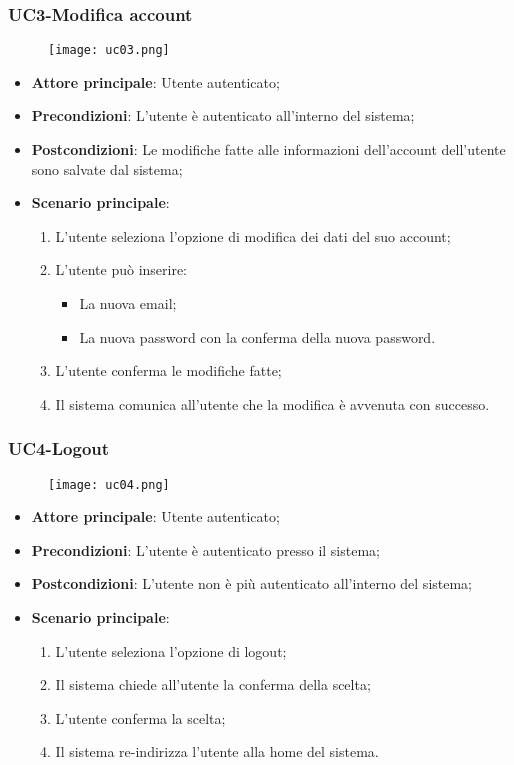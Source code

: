 \nonstopmode
\pagebreak
\subsubsection{UC3-Modifica account}
\begin{figure}[h] \texttt{[image: uc03.png]} \end{figure}

\begin{itemize}
\item \textbf{Attore principale}: Utente autenticato;
\item \textbf{Precondizioni}: L'utente è autenticato all'interno del sistema;
\item \textbf{Postcondizioni}: Le modifiche fatte alle informazioni dell'account dell'utente sono salvate dal sistema;
\item \textbf{Scenario principale}:
\begin{enumerate}
\item L'utente seleziona l'opzione di modifica dei dati del suo account;
\item L'utente può inserire:
\begin{itemize}
\item La nuova email;
\item La nuova password con la conferma della nuova password.
\end{itemize}
\item L'utente conferma le modifiche fatte;
\item Il sistema comunica all'utente che la modifica è avvenuta con successo.
\end{enumerate}
\end{itemize}

\subsubsection{UC4-Logout}
\begin{figure}[h] \texttt{[image: uc04.png]} \end{figure}

\begin{itemize}
\item \textbf{Attore principale}: Utente autenticato;
\item \textbf{Precondizioni}: L'utente è autenticato presso il sistema;
\item \textbf{Postcondizioni}: L'utente non è più autenticato all'interno del sistema;
\item \textbf{Scenario principale}:
\begin{enumerate}
\item L'utente seleziona l'opzione di logout;
\item Il sistema chiede all'utente la conferma della scelta;
\item L'utente conferma la scelta;
\item Il sistema re-indirizza l'utente alla home del sistema.
\end{enumerate}
\end{itemize}

